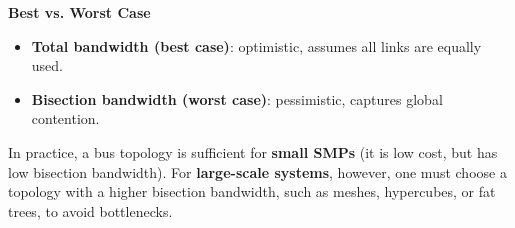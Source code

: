\highspace
\begin{flushleft}
    \textcolor{Green3}{ \textbf{Best vs. Worst Case}}
\end{flushleft}
\begin{itemize}
    \item[\textcolor{Green3}{\faIcon{check}}] \textbf{Total bandwidth (best case)}: optimistic, assumes all links are equally used.
    \item[\textcolor{Red2}{\faIcon{times}}] \textbf{Bisection bandwidth (worst case)}: pessimistic, captures global contention.
\end{itemize}
In practice, a bus topology is sufficient for \textbf{small SMPs} (it is low cost, but has low bisection bandwidth). For \textbf{large-scale systems}, however, one must choose a topology with a higher bisection bandwidth, such as meshes, hypercubes, or fat trees, to avoid bottlenecks.